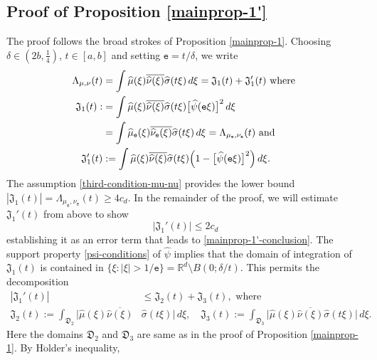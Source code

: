 \documentclass[a4paper,11pt]{amsart}
\numberwithin{equation}{section}
\begin{document}
\subsection{Proof of Proposition \ref{mainprop-1'}}
The proof follows the broad strokes of Proposition \ref{mainprop-1}. Choosing $\delta \in (2b, \frac14)$, $t \in [a, b]$ and setting $\mathtt e = t/\delta$, we write 
\begin{align} 
\Lambda_{\mu, \nu}(t) &= \int \widehat{\mu}(\xi) \overline{\widehat{\nu}(\xi)} \widehat{\sigma}(t \xi) \, d\xi = \mathfrak J_1(t) + \mathfrak J_1'(t) \text{ where } \\ 
\mathfrak J_1(t) :&= \int \widehat{\mu}(\xi) \overline{\widehat{\nu}(\xi)} \widehat{\sigma}(t \xi) \bigl[\widehat{\psi}(\mathtt e \xi)\bigr]^2 \, d\xi \nonumber \\ &= \int \widehat{\mu}_{\mathtt e}(\xi) \overline{\widehat{\nu}_{\mathtt e}(\xi)} \widehat{\sigma}(t \xi) \, d\xi  = \Lambda_{\mu_{\mathtt e}, \nu_{\mathtt e}}(t) \text{ and } \nonumber \\ 
 \mathfrak J_1'(t) &:= \int \widehat{\mu}(\xi) \overline{\widehat{\nu}(\xi)} \widehat{\sigma}(t \xi) \Bigl(1 - \bigl[\widehat{\psi}(\mathtt e \xi)\bigr]^2 \Bigr) \, d\xi. \nonumber 
\end{align}  
The assumption \eqref{third-condition-mu-nu} provides the lower bound $|\mathfrak J_1(t)| = \Lambda_{\mu_{\mathtt e}, \nu_{\mathtt e}} (t) \geq 4c_d$. In the remainder of the proof, we will estimate $\mathfrak J_1'(t)$ from above to show 
\begin{equation}  
\bigl| \mathfrak J_1'(t) \bigr| \leq 2 c_d  
\end{equation}   
establishing it as an error term that leads to \eqref{mainprop-1'-conclusion}. The support property \eqref{psi-conditions}  of $\widehat{\psi}$ implies that the domain of integration of $\mathfrak J_1(t)$ is contained in $\{\xi : |\xi| > 1/\mathtt e \} = \mathbb R^d \setminus B(0; \delta/t)$. This permits the decomposition
\begin{align*}
|\mathfrak J_1'(t)| &\leq \mathfrak J_2(t) + \mathfrak J_3(t), \text{ where } \\
\mathfrak J_2(t) := \int_{\mathfrak D_2} \bigl|\widehat{\mu}(\xi) \overline{\widehat{\nu}(\xi)} &\widehat{\sigma}(t \xi) \bigr| \, d\xi, \quad
\mathfrak J_3(t) := \int_{\mathfrak D_3} \bigl|\widehat{\mu}(\xi) \overline{\widehat{\nu}(\xi)} \widehat{\sigma}(t \xi) \bigr| \, d\xi.  
\end{align*} 
Here the domains $\mathfrak D_2$ and $\mathfrak D_3$ are same as in the proof of Proposition \ref{mainprop-1}. By H$\ddot{\text{o}}$lder's inequality, 
\end{document}
